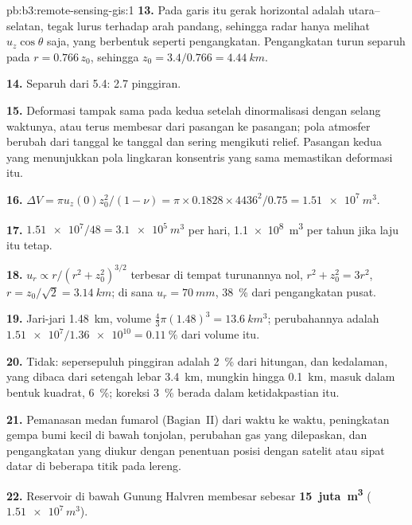 \begin{solution}{pb:b3:remote-sensing-gis:1}
\textbf{13.} Pada garis itu gerak horizontal adalah utara--selatan,
tegak lurus terhadap arah pandang, sehingga radar hanya melihat $u_z\cos\theta$ saja, yang
berbentuk seperti pengangkatan. Pengangkatan turun separuh pada $r = 0.766\,z_0$, sehingga $z_0 =
3.4/0.766 = \qty{4.44}{km}$.

\textbf{14.} Separuh dari 5.4: 2.7 pinggiran.

\textbf{15.} Deformasi tampak sama pada kedua  setelah
dinormalisasi dengan selang waktunya, atau terus membesar dari pasangan ke pasangan; pola
atmosfer berubah dari tanggal ke tanggal dan sering mengikuti
relief. Pasangan kedua yang menunjukkan pola lingkaran konsentris yang sama memastikan
deformasi itu.

\textbf{16.} $\Delta V = \pi u_z(0)z_0^2/(1 - \nu) = \pi\times0.1828\times
4436^2/0.75 = \qty{1.51e7}{m^3}$.

\textbf{17.} $\num{1.51e7}/48 = \qty{3.1e5}{m^3}$ per hari, \qty{1.1e8}{m^3}
per tahun jika laju itu tetap.

\textbf{18.} $u_r \propto r/(r^2 + z_0^2)^{3/2}$ terbesar di tempat
turunannya nol, $r^2 + z_0^2 = 3r^2$, $r = z_0/\sqrt2 = \qty{3.14}{km}$;
di sana $u_r = \qty{70}{mm}$, \qty{38}{\percent} dari pengangkatan pusat.

\textbf{19.} Jari-jari \qty{1.48}{km}, volume $\frac43\pi(1.48)^3 =
\qty{13.6}{km^3}$; perubahannya adalah $\num{1.51e7}/\num{1.36e10} =
\qty{0.11}{\percent}$ dari volume itu.

\textbf{20.} Tidak: sepersepuluh pinggiran adalah \qty{2}{\percent} dari hitungan, dan
kedalaman, yang dibaca dari setengah lebar \qty{3.4}{km}, mungkin hingga
\qty{0.1}{km}, masuk dalam bentuk kuadrat, \qty{6}{\percent}; koreksi \qty{3}{\percent}
berada dalam ketidakpastian itu.

\textbf{21.} Pemanasan medan fumarol (Bagian~II) dari waktu ke waktu, peningkatan
gempa bumi kecil di bawah tonjolan, perubahan gas yang
dilepaskan, dan pengangkatan yang diukur dengan penentuan posisi dengan satelit atau sipat datar di
beberapa titik pada lereng.

\textbf{22.} Reservoir di bawah Gunung Halvren membesar sebesar
\textbf{15~juta~\unit[text-series-to-math=true]{m^3}} ($\num{1.51e7}\,\unit{m^3}$).
\end{solution}
